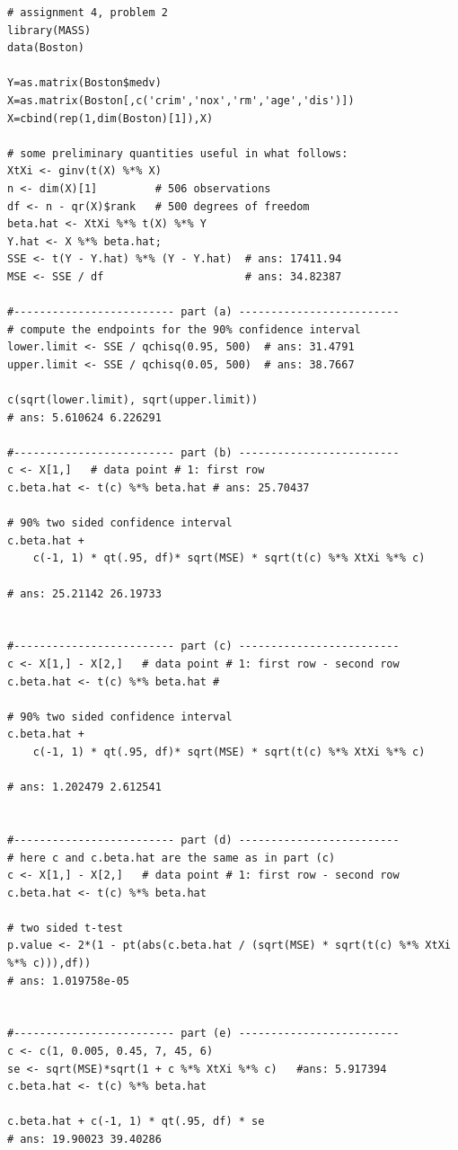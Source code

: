 \documentclass[paper=a4, fontsize=11pt]{scrartcl} %
\begin{document}
\begin{lstlisting}[basicstyle=\ttfamily\small\bfseries]
# assignment 4, problem 2
library(MASS)
data(Boston)

Y=as.matrix(Boston$medv)
X=as.matrix(Boston[,c('crim','nox','rm','age','dis')])
X=cbind(rep(1,dim(Boston)[1]),X)

# some preliminary quantities useful in what follows:
XtXi <- ginv(t(X) %*% X) 
n <- dim(X)[1]         # 506 observations
df <- n - qr(X)$rank   # 500 degrees of freedom
beta.hat <- XtXi %*% t(X) %*% Y
Y.hat <- X %*% beta.hat; 
SSE <- t(Y - Y.hat) %*% (Y - Y.hat)  # ans: 17411.94
MSE <- SSE / df                      # ans: 34.82387

#------------------------- part (a) -------------------------
# compute the endpoints for the 90% confidence interval
lower.limit <- SSE / qchisq(0.95, 500)  # ans: 31.4791
upper.limit <- SSE / qchisq(0.05, 500)  # ans: 38.7667

c(sqrt(lower.limit), sqrt(upper.limit))
# ans: 5.610624 6.226291

#------------------------- part (b) -------------------------
c <- X[1,]   # data point # 1: first row
c.beta.hat <- t(c) %*% beta.hat # ans: 25.70437

# 90% two sided confidence interval
c.beta.hat +
    c(-1, 1) * qt(.95, df)* sqrt(MSE) * sqrt(t(c) %*% XtXi %*% c)

# ans: 25.21142 26.19733


#------------------------- part (c) -------------------------
c <- X[1,] - X[2,]   # data point # 1: first row - second row
c.beta.hat <- t(c) %*% beta.hat #

# 90% two sided confidence interval
c.beta.hat +
    c(-1, 1) * qt(.95, df)* sqrt(MSE) * sqrt(t(c) %*% XtXi %*% c)

# ans: 1.202479 2.612541


#------------------------- part (d) -------------------------
# here c and c.beta.hat are the same as in part (c)
c <- X[1,] - X[2,]   # data point # 1: first row - second row
c.beta.hat <- t(c) %*% beta.hat 

# two sided t-test
p.value <- 2*(1 - pt(abs(c.beta.hat / (sqrt(MSE) * sqrt(t(c) %*% XtXi %*% c))),df))
# ans: 1.019758e-05


#------------------------- part (e) -------------------------
c <- c(1, 0.005, 0.45, 7, 45, 6)
se <- sqrt(MSE)*sqrt(1 + c %*% XtXi %*% c)   #ans: 5.917394
c.beta.hat <- t(c) %*% beta.hat 

c.beta.hat + c(-1, 1) * qt(.95, df) * se
# ans: 19.90023 39.40286



\end{lstlisting}
\end{document}
